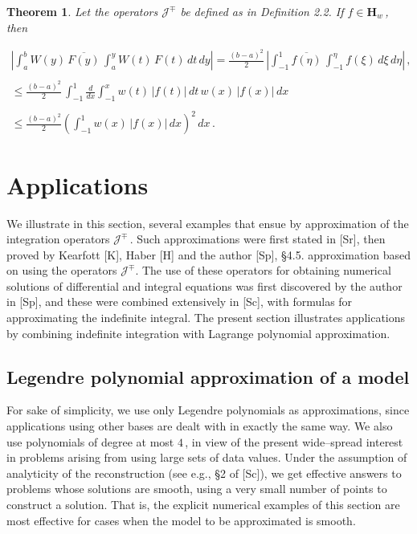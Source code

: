 \documentclass[11pt]{article}
\newtheorem{Theorem}{Theorem}[section]
\begin{document}
\newpage
\begin{Theorem}%
  \label{theorem:3.3}
Let the operators ${\mathcal J}^\mp$ be defined as in Definition 2.2.
If $f \in {\mathbf H}_w$\,, then

\begin{equation}%
  \begin{array}{l}
\displaystyle \left|\int_a^bW(y)\,\overline{F(y)} \, \int_a^y W(t) \,
F(t) \, dt\, dy \right| = \displaystyle \frac{(b-a)^2}{2} \,
\left|\int_{-1}^1 \overline{f(\eta)}\,\int_{-1}^\eta f(\xi) \, d\xi \,
d\eta\right| \,, \\
\\
\leq \displaystyle \frac{(b-a)^2}{2} \, \int_{-1}^1 \frac{d}{dx}
\int_{-1}^x w(t) \, |f(t)| \, dt \, w(x) \, |f(x)| \, dx \\
\\
\leq \displaystyle \frac{(b-a)^2}{2} \left(\int_{-1}^1
w(x)\,|f(x)|\,dx\right)^2\, dx\,.
\end{array}
  \label{equation:3.9}
\end{equation}

\end{Theorem}

\vspace{.2in} \noindent \section{Applications} %
 \setcounter{equation}{0}

We illustrate in this section, several examples that ensue by
approximation of the integration operators ${\mathcal J}^\mp$\,.  Such
approximations were first stated in [Sr], then proved by Kearfott [K],
Haber [H] and the author [Sp], \S4.5.  approximation based on using
the operators ${\mathcal J}^\mp$.  The use of these operators for
obtaining numerical solutions of differential and integral equations
was first discovered by the author in [Sp], and these were combined
extensively in [Sc], with formulas for approximating the indefinite
integral.  The present section illustrates applications by combining
indefinite integration with Lagrange polynomial approximation.

\subsection{Legendre polynomial approximation of a model}%

\vspace{.2in} \noindent For sake of simplicity, we use only Legendre
polynomials as approximations, since applications using other bases
are dealt with in exactly the same way.  We also use polynomials of
degree at most $4$\,, in view of the present wide--spread interest in
problems arising from using large sets of data values.  Under the
assumption of analyticity of the reconstruction (see e.g., \S2 of
[Sc]), we get effective answers to problems whose solutions are
smooth, using a very small number of points to construct a solution.
That is, the explicit numerical examples of this section are most
effective for cases when the model to be approximated is smooth.
\end{document}
